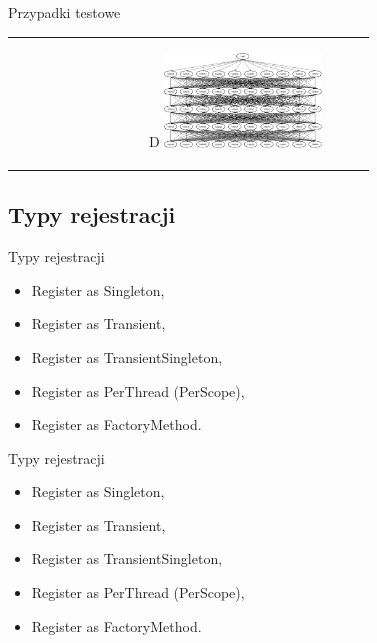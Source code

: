 \documentclass{beamer}
\begin{document}
\begin{frame}{Przypadki testowe}
\begin{table}
\begin{small}
\begin{tabular}{ p{4cm} p{6cm} }
\begin{minipage}{.5\textwidth}
\begin{figure}[H]
\end{figure}
   	 \end{minipage}
   	 &	
	\begin{minipage}{.5\textwidth}
\begin{figure}[H]
	\begin{center}
		D
  		\includegraphics[height=2.5cm]{TestD.png}
	\end{center}
\end{figure}
   	 \end{minipage}

	\end{tabular}
     \end{small}
\end{table}
\end{frame}

\subsection*{Typy rejestracji}

\begin{frame}{Typy rejestracji}
\begin{itemize}
	\item Register as Singleton,
	\item Register as Transient,
	\item Register as TransientSingleton,
	\item Register as PerThread (PerScope),
	\item Register as FactoryMethod.
\end{itemize}
\end{frame}

\begin{frame}{Typy rejestracji}
\begin{itemize}
	\color{gray}
	\item Register as Singleton,
	\color{black}
	\item Register as Transient,
	\color{gray}
	\item Register as TransientSingleton,
	\item Register as PerThread (PerScope),
	\item Register as FactoryMethod.
\end{itemize}
\end{frame}
\end{document}
